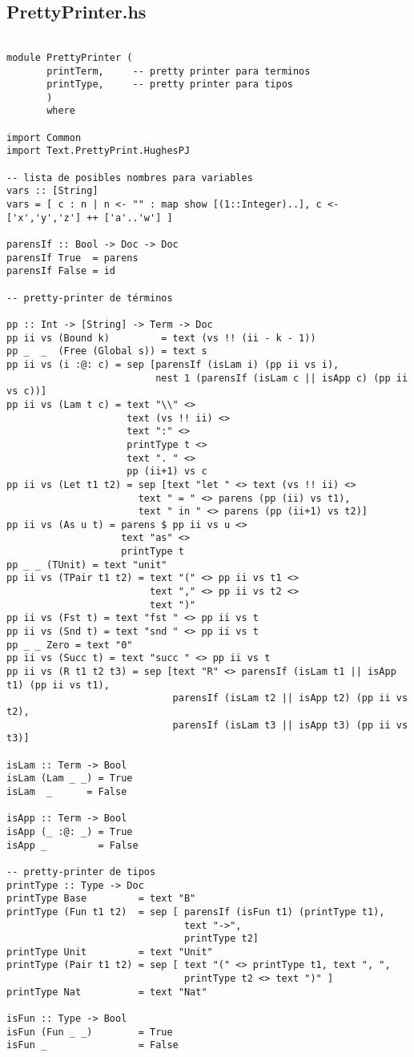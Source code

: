 \documentclass[a4paper]{report}
\begin{document}
\subsection*{PrettyPrinter.hs}
\begin{lstlisting}

module PrettyPrinter (
       printTerm,     -- pretty printer para terminos
       printType,     -- pretty printer para tipos
       )
       where

import Common
import Text.PrettyPrint.HughesPJ

-- lista de posibles nombres para variables
vars :: [String]
vars = [ c : n | n <- "" : map show [(1::Integer)..], c <- ['x','y','z'] ++ ['a'..'w'] ]

parensIf :: Bool -> Doc -> Doc
parensIf True  = parens
parensIf False = id

-- pretty-printer de términos

pp :: Int -> [String] -> Term -> Doc
pp ii vs (Bound k)         = text (vs !! (ii - k - 1))
pp _  _  (Free (Global s)) = text s
pp ii vs (i :@: c) = sep [parensIf (isLam i) (pp ii vs i),
                          nest 1 (parensIf (isLam c || isApp c) (pp ii vs c))]
pp ii vs (Lam t c) = text "\\" <>
                     text (vs !! ii) <>
                     text ":" <>
                     printType t <>
                     text ". " <>
                     pp (ii+1) vs c
pp ii vs (Let t1 t2) = sep [text "let " <> text (vs !! ii) <>
                       text " = " <> parens (pp (ii) vs t1),
                       text " in " <> parens (pp (ii+1) vs t2)]
pp ii vs (As u t) = parens $ pp ii vs u <>
                    text "as" <>
                    printType t
pp _ _ (TUnit) = text "unit"
pp ii vs (TPair t1 t2) = text "(" <> pp ii vs t1 <>
                         text "," <> pp ii vs t2 <>
                         text ")"
pp ii vs (Fst t) = text "fst " <> pp ii vs t
pp ii vs (Snd t) = text "snd " <> pp ii vs t
pp _ _ Zero = text "0"
pp ii vs (Succ t) = text "succ " <> pp ii vs t
pp ii vs (R t1 t2 t3) = sep [text "R" <> parensIf (isLam t1 || isApp t1) (pp ii vs t1),
                             parensIf (isLam t2 || isApp t2) (pp ii vs t2),
                             parensIf (isLam t3 || isApp t3) (pp ii vs t3)]

isLam :: Term -> Bool
isLam (Lam _ _) = True
isLam  _      = False

isApp :: Term -> Bool
isApp (_ :@: _) = True
isApp _         = False

-- pretty-printer de tipos
printType :: Type -> Doc
printType Base         = text "B"
printType (Fun t1 t2)  = sep [ parensIf (isFun t1) (printType t1),
                               text "->",
                               printType t2]
printType Unit         = text "Unit"
printType (Pair t1 t2) = sep [ text "(" <> printType t1, text ", ",
                               printType t2 <> text ")" ]
printType Nat          = text "Nat"

isFun :: Type -> Bool
isFun (Fun _ _)        = True
isFun _                = False

\end{lstlisting}
\end{document}
